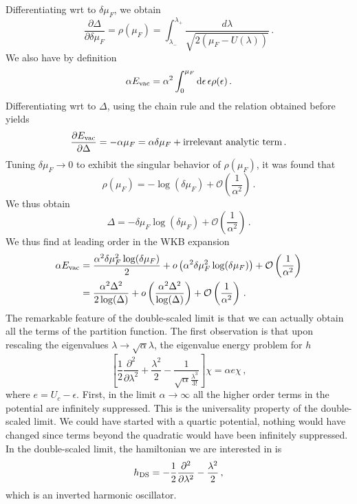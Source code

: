 \documentclass[a4paper]{article}
\begin{document}
Differentiating wrt to $\delta \mu_F$, we obtain
\begin{equation}
  \frac{\partial \Delta}{\partial \delta \mu_F} = \rho(\mu_F)=\int_{\lambda_-}^{\lambda_+} \frac{d\lambda}{\sqrt{2\left(\mu_F-U(\lambda)\right)}}\,.
\end{equation}
We also have by definition 
\begin{equation}
  \alpha E_{\rm vac} = \alpha^2 \int_{0}^{\mu_F}  \rm{d}\epsilon\, \epsilon\rho(\epsilon)\,.
\end{equation}
Differentiating wrt to $\Delta$, using the chain rule and the relation obtained before yields
\begin{equation}
  \frac{\partial E_{\rm vac}}{\partial \Delta} = -\alpha \mu_F = \alpha \delta \mu_F + \text{irrelevant analytic term}\,.
\end{equation}
Tuning $\delta \mu_F\to 0$ to exhibit the singular behavior of $\rho(\mu_F)$, it was found that 
\begin{equation}
  \rho(\mu_F) = -\log(\delta \mu_F)+\mathcal{O}\left(\frac{1}{\alpha^2}\right)\,.
\end{equation}
We thus obtain
\begin{equation}
  \Delta = -\delta \mu_F \log(\delta \mu_F)+\mathcal{O}\left(\frac{1}{\alpha^2}\right)\,.
\end{equation}
We thus find at leading order in the WKB expansion
\begin{equation}
\begin{aligned}
  \alpha E_{\rm vac} &= \frac{\alpha^2 \delta \mu_F^2 \log(\delta \mu_F)}{2} +o\left(\alpha^2 \delta \mu_F^2 \log(\delta \mu_F)\right) +\mathcal{O}\left(\frac{1}{\alpha^2}\right) \\
  &= \frac{\alpha^2 \Delta^2}{2\log(\Delta)} +o\left(\frac{\alpha^2\Delta^2}{\log(\Delta)}\right) +\mathcal{O}\left(\frac{1}{\alpha^2}\right)\,.
\end{aligned}
\end{equation}
The remarkable feature of the double-scaled limit is that we can actually obtain all the terms of the partition function. The first observation is that upon rescaling the eigenvalues $\lambda \to \sqrt{\alpha}\lambda$, the eigenvalue energy problem for $h$
\begin{equation}
  \left[\frac{1}{2}\frac{\partial^2}{\partial \lambda^2}+\frac{\lambda^2}{2}-\frac{1}{\sqrt{\alpha}\frac{\lambda^3}{3!}}\right]\chi = \alpha e \chi\,,
\end{equation}
where $e = U_c - \epsilon$. First, in the limit $\alpha \to \infty$ all the higher order terms in the potential are infinitely suppressed. This is the universality property of the double-scaled limit. We could have started with a quartic potential, nothing would have changed since terms beyond the quadratic would have been infinitely suppressed. In the double-scaled limit, the hamiltonian we are interested in is
\begin{equation}
  h_{\rm DS} = -\frac{1}{2}\frac{\partial^2}{\partial \lambda^2}-\frac{\lambda^2}{2}\,,
\end{equation}
which is an inverted harmonic oscillator.
\end{document}
